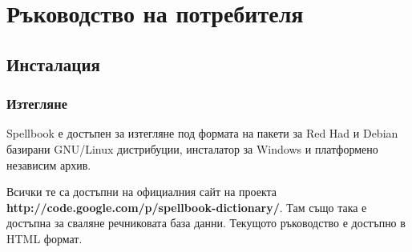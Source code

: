 \chapter{Ръководство на потребителя}
\section{Инсталация}
\subsection{Изтегляне}
Spellbook е достъпен за изтегляне под формата на пакети за Red Had и
Debian базирани GNU/Linux дистрибуции, инсталатор за Windows и
платформено независим архив.

Всички те са достъпни на официалния сайт на проекта
\textbf{http://code.google.com/p/spellbook-dictionary/}. Там също така
е достъпна за сваляне речниковата база данни. Текущото ръководство е
достъпно в HTML формат.
